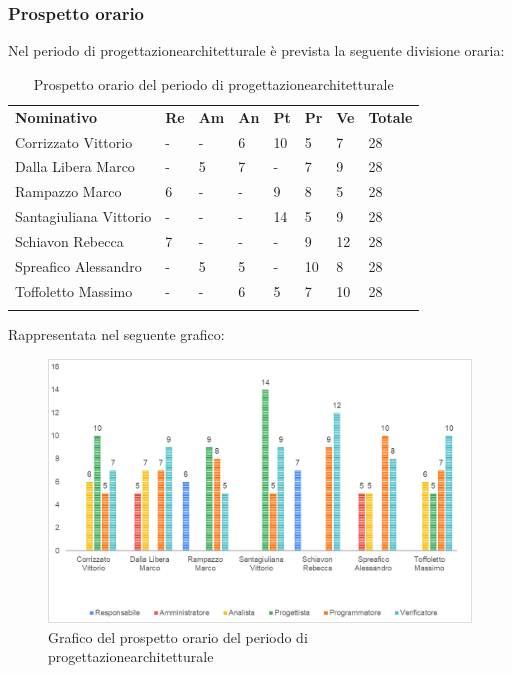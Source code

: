 	\subsubsection{Prospetto orario}
	Nel periodo di progettazione\glosp architetturale è prevista la seguente divisione oraria:
	\begin{longtable} {				
		>{}p{40mm}  
		>{}p{8mm}
		>{}p{8mm}
		>{}p{8mm}
		>{}p{8mm}
		>{}p{8mm}
		>{}p{8mm}
		>{}p{12mm}				
	}			
	\rowcolor{gray!50}
	\textbf{Nominativo} & \textbf{Re} & \textbf{Am} & \textbf{An} & \textbf{Pt} & \textbf{Pr} & \textbf{Ve} & \textbf{Totale}	\TBstrut \\ [2mm]
	Corrizzato Vittorio & - & - & 6 & 10 & 5 & 7 & 28 \TBstrut \\ [2mm]
	Dalla Libera Marco & - & 5 & 7 & - & 7 & 9 & 28 \TBstrut \\ [2mm]
	Rampazzo Marco & 6 & - & - & 9 & 8 & 5 & 28 \TBstrut \\ [2mm]
	Santagiuliana Vittorio & - & - & - & 14 & 5 & 9 & 28 \TBstrut \\ [2mm]
	Schiavon Rebecca & 7 & - & - & - & 9 & 12 & 28 \TBstrut \\ [2mm]
	Spreafico Alessandro & - & 5 & 5 & - & 10 & 8 & 28 \TBstrut \\ [2mm]
	Toffoletto Massimo & - & - & 6 & 5 & 7 & 10 & 28 \TBstrut \\ [2mm]
	\rowcolor{white}
	\caption{Prospetto orario del periodo di progettazione\glosp architetturale}
	\end{longtable}
	\pagebreak
	Rappresentata nel seguente grafico:
	\begin{figure} [H]
		\includegraphics[width=\linewidth]{./img/Grafici/3.png}
		\caption{Grafico del prospetto orario del periodo di progettazione\glosp architetturale}
	\end{figure}

